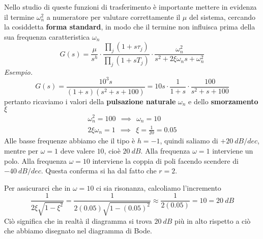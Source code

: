 \begin{figure}[htpb]
\end{figure}\FloatBarrier

Nello studio di queste funzioni di trasferimento è importante mettere in evidenza il termine $\omega ^2_n$ a numeratore per valutare correttamente il $\mu $ del sistema, cercando la cosiddetta \textbf{forma standard}, in modo che il termine non influisca prima della sua frequenza caratteristica $\omega _n$
\begin{equation*}
	\boxed{G(s) =\frac{\mu }{s^h} \cdot \frac{\prod _j(1+s\tau _j)}{\prod _j(1+sT_j)} \cdot \frac{\omega ^2_n}{s^2 +2\xi \omega _n s+\omega ^2_n}}
\end{equation*}
\textit{Esempio.}
\begin{equation*}
	G(s) =\frac{10^3 s}{(1+s)\left(s^2 +s+100\right)} =10s\cdot \frac{1}{1+s} \cdot \frac{100}{s^2 +s+100}
\end{equation*}
pertanto ricaviamo i valori della \textbf{pulsazione naturale} $\omega _n$ e dello \textbf{smorzamento} $\xi $
\begin{gather*}
	\omega ^2_n =100\ \ \implies \ \ \omega _n =10\\
	2\xi \omega _n =1\ \ \implies \ \ \xi =\frac{1}{20} =0.05
\end{gather*}
Alle basse frequenze abbiamo che il tipo è $h=-1$, quindi saliamo di $+20\ \si{dB/dec}$, mentre per $\omega =1$ deve valere $10$, cioè $20\ \si{dB}$. Alla frequenza $\omega =1$ interviene un polo. Alla frequenza $\omega =10$ interviene la coppia di poli facendo scendere di $-40\ \si{dB/dec}$. Questa conferma si ha dal fatto che $r=2$.

Per assicurarci che in $\omega =10$ ci sia risonanza, calcoliamo l'incremento
\begin{equation*}
	\frac{1}{2\xi \sqrt{1-\xi ^2}} =\frac{1}{2(0.05)\sqrt{1-(0.05)^2}} \approx \frac{1}{2(0.05)} =10=20\ \si{dB}
\end{equation*}
Ciò significa che in realtà il diagramma si trova $20\ \si{dB}$ più in alto rispetto a ciò che abbiamo disegnato nel diagramma di Bode.

